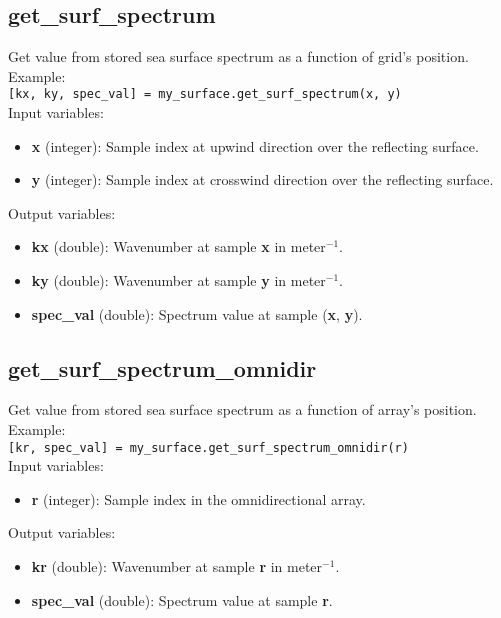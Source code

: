 \subsection{get\_surf\_spectrum}

Get value from stored sea surface spectrum as a function of grid's position.\\

Example:\\

\texttt{[kx, ky, spec\_val] = my\_surface.get\_surf\_spectrum(x, y)}\\

Input variables:
\begin{itemize}
\item {\bf x} (integer): Sample index at upwind direction over the reflecting surface.
\item {\bf y} (integer): Sample index at crosswind direction over the reflecting surface.
\end{itemize}

Output variables:
\begin{itemize}
\item {\bf kx} (double): Wavenumber at sample {\bf x} in meter$^{-1}$.
\item {\bf ky} (double): Wavenumber at sample {\bf y} in meter$^{-1}$.
\item {\bf spec\_val} (double): Spectrum value at sample ({\bf x}, {\bf y}).
\end{itemize}


\subsection{get\_surf\_spectrum\_omnidir}

Get value from stored sea surface spectrum as a function of array's position.\\

Example:\\

\texttt{[kr, spec\_val] = my\_surface.get\_surf\_spectrum\_omnidir(r)}\\

Input variables:
\begin{itemize}
\item {\bf r} (integer): Sample index in the omnidirectional array.
\end{itemize}

Output variables:
\begin{itemize}
\item {\bf kr} (double): Wavenumber at sample {\bf r} in meter$^{-1}$.
\item {\bf spec\_val} (double): Spectrum value at sample {\bf r}.
\end{itemize}


